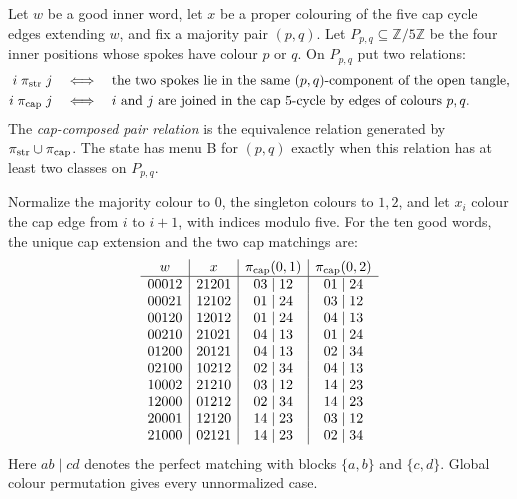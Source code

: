 \begin{definition}
\label{def:cap-composed-pair-relation}
Let $w$ be a good inner word, let $x$ be a proper colouring of the five cap
cycle edges extending $w$, and fix a majority pair $(p,q)$.  Let
$P_{p,q}\subseteq\mathbb Z/5\mathbb Z$ be the four inner positions whose
spokes have colour $p$ or $q$.  On $P_{p,q}$ put two relations:
\begin{align*}
 i\mathrel{\pi_{\rm str}}j
   &\quad\Longleftrightarrow\quad
   \text{the two spokes lie in the same $(p,q)$-component of the open tangle},\\
 i\mathrel{\pi_{\rm cap}}j
   &\quad\Longleftrightarrow\quad
   \text{$i$ and $j$ are joined in the cap $5$-cycle by edges of colours
   $p,q$}.
\end{align*}
The \emph{cap-composed pair relation} is the equivalence relation generated
by $\pi_{\rm str}\cup\pi_{\rm cap}$.  The state has menu B for $(p,q)$
exactly when this relation has at least two classes on $P_{p,q}$.
\end{definition}

\begin{lemma}
\label{lem:finite-cap-pairing-table}
Normalize the majority colour to $0$, the singleton colours to $1,2$,
and let $x_i$ colour the cap edge from $i$ to $i+1$, with indices
modulo five.  For the ten good words, the unique cap extension and the two
cap matchings are:
\[
\begin{array}{c|c|c|c}
w&x&\pi_{\rm cap}(0,1)&\pi_{\rm cap}(0,2)\\ \hline
00012&21201&03\mid12&01\mid24\\
00021&12102&01\mid24&03\mid12\\
00120&12012&01\mid24&04\mid13\\
00210&21021&04\mid13&01\mid24\\
01200&20121&04\mid13&02\mid34\\
02100&10212&02\mid34&04\mid13\\
10002&21210&03\mid12&14\mid23\\
12000&01212&02\mid34&14\mid23\\
20001&12120&14\mid23&03\mid12\\
21000&02121&14\mid23&02\mid34
\end{array}
\]
Here $ab\mid cd$ denotes the perfect matching with blocks
$\{a,b\}$ and $\{c,d\}$.  Global colour permutation gives every
unnormalized case.
\end{lemma}

